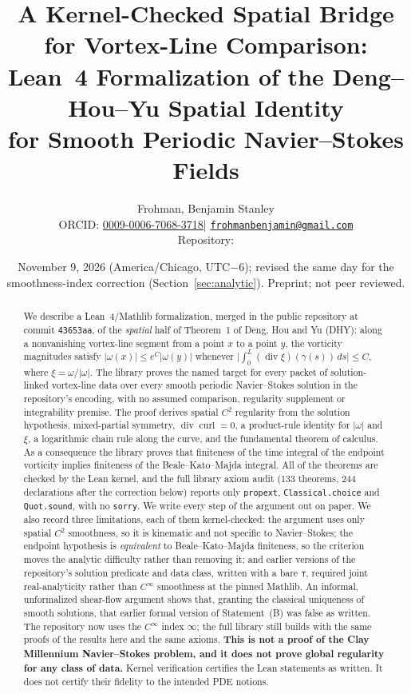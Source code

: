\documentclass[11pt,a4paper]{article}
\title{\textbf{A Kernel-Checked Spatial Bridge for Vortex-Line Comparison:\\
Lean~4 Formalization of the Deng--Hou--Yu Spatial Identity\\
for Smooth Periodic Navier--Stokes Fields}}
\author{Frohman, Benjamin Stanley\\
\small ORCID: \href{https://orcid.org/0009-0006-7068-3718}{0009-0006-7068-3718}\quad|\quad
\href{mailto:frohmanbenjamin@gmail.com}{\texttt{frohmanbenjamin@gmail.com}}\\
\small Repository: \href{https://github.com/BenFrohman/Clay-}{\lean{https://github.com/BenFrohman/Clay-}}}
\date{November 9, 2026 (America/Chicago, UTC$-6$); revised the same day for the
smoothness-index correction (Section~\ref{sec:analytic}). Preprint; not peer reviewed.}
\theoremstyle{plain}
\theoremstyle{definition}
\newcommand{\lean}[1]{{\upshape\path{#1}}}
\DeclareMathOperator{\curl}{curl}
\renewcommand{\div}{\operatorname{div}}
\begin{document}
\maketitle
{}\par


\begin{abstract}
We describe a Lean~4/Mathlib formalization, merged in the public repository
\lean{BenFrohman/Clay-} at commit \texttt{43653aa}, of the \emph{spatial} half
of Theorem~1 of Deng, Hou and Yu (DHY): along a nonvanishing vortex-line
segment from a point $x$ to a point $y$, the vorticity magnitudes satisfy
$|\omega(x)|\le e^{C}|\omega(y)|$ whenever
$\bigl|\int_0^{L}(\div\xi)(\gamma(s))\,ds\bigr|\le C$, where
$\xi=\omega/|\omega|$. The library proves the named target
\lean{SpatialBridgeObligation} for every packet of solution-linked
vortex-line data over every smooth periodic Navier--Stokes solution in the
repository's encoding, with no assumed comparison, regularity supplement or
integrability premise. The proof derives spatial $C^2$ regularity from the
solution hypothesis, mixed-partial symmetry, $\div\curl=0$, a product-rule
identity for $|\omega|$ and $\xi$, a logarithmic chain rule along the curve,
and the fundamental theorem of calculus. As a consequence the library proves
that finiteness of the time integral of the endpoint vorticity implies
finiteness of the Beale--Kato--Majda integral. All of the theorems are checked
by the Lean kernel, and the full library axiom audit (133 theorems, 244
declarations after the correction below) reports only \texttt{propext}, \texttt{Classical.choice} and
\texttt{Quot.sound}, with no \texttt{sorry}. We write every step of the
argument out on paper. We also record three limitations, each of them
kernel-checked: the argument uses only spatial $C^2$ smoothness, so it is
kinematic and not specific to Navier--Stokes; the endpoint hypothesis is
\emph{equivalent} to Beale--Kato--Majda finiteness, so the criterion moves the
analytic difficulty rather than removing it; and earlier versions of the
repository's solution predicate and data class, written with a bare
\texttt{⊤}, required joint real-analyticity rather than $C^\infty$ smoothness
at the pinned Mathlib. An informal, unformalized shear-flow argument shows
that, granting the classical uniqueness of smooth solutions, that earlier
formal version of Statement~(B) was false as written. The repository now uses
the $C^\infty$ index $\infty$; the full library still builds with the same
proofs of the results here and the same axioms. \textbf{This is not a proof of the Clay Millennium
Navier--Stokes problem, and it does not prove global regularity for any class
of data.} Kernel verification certifies the Lean statements as written. It
does not certify their fidelity to the intended PDE notions.
\end{abstract}
\end{document}
